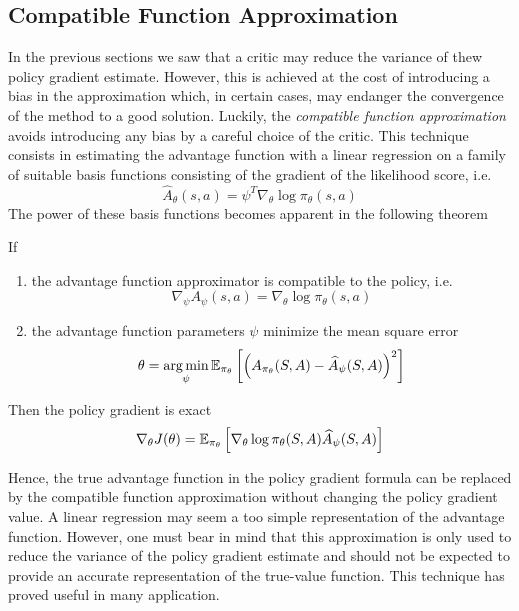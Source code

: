 \subsection{Compatible Function Approximation}
In the previous sections we saw that a critic may reduce the variance of thew policy gradient estimate. However, this is achieved at the cost of introducing a bias in the approximation which, in certain cases, may endanger the convergence of the method to a good solution. Luckily, the \emph{compatible function approximation}  \cite{sutton1999policy} avoids introducing any bias by a careful choice of the critic. This technique consists in estimating the advantage function with a linear regression on a family of suitable basis functions consisting of the gradient of the likelihood score, i.e.
\begin{equation}
	\widehat{A}_\theta (s,a) = \psi^T \nabla_\theta \log \pi_\theta(s,a)
\end{equation}
The power of these basis functions becomes apparent in the following theorem
\begin{theorem}
	If 
	\begin{enumerate}[label={\roman*)}]
		\item the advantage function approximator is compatible to the policy, i.e. 
		\begin{equation}
			\nabla_\psi A_\psi(s,a) = \nabla_\theta \log \pi_\theta(s,a)
		\end{equation}
		\item the advantage function parameters $\psi$ minimize the mean square error 
		\begin{equation}
			\theta = \argmin_\psi \E[\pi_\theta]{\left( A_{\pi_\theta}(S,A) - \widehat{A}_\psi(S,A)\right)^2}
		\end{equation}
	\end{enumerate}
	Then the policy gradient is exact
	\begin{equation}
		\nabla_\theta J(\theta) = \E[\pi_\theta]{\nabla_\theta \log \pi_\theta(S,A) \widehat{A}_\psi(S,A)}
	\end{equation}
\end{theorem} 
Hence, the true advantage function in the policy gradient formula can be replaced by the compatible function approximation without changing the policy gradient value. A linear regression may seem a too simple representation of the advantage function. However, one must bear in mind that this approximation is only used to reduce the variance of the policy gradient estimate and should not be expected to provide an accurate representation of the true-value function. This technique has proved useful in many application. 

